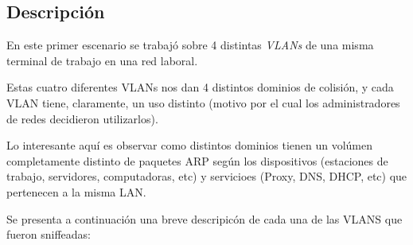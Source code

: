     \subsection{Descripci\'on}
    \par En este primer escenario se trabaj\'o sobre 4 distintas \textit{VLANs}
    de una misma terminal de trabajo en una red laboral.

    \par Estas cuatro diferentes VLANs nos dan 4 distintos dominios de colisi\'on,
    y cada VLAN tiene, claramente, un uso distinto (motivo por el cual los
    administradores de redes decidieron utilizarlos).

    \par Lo interesante aqu\'i es observar como distintos dominios tienen un
    vol\'umen completamente distinto de paquetes ARP seg\'un los dispositivos
    (estaciones de trabajo, servidores, computadoras, etc) y servicioes (Proxy,
    DNS, DHCP, etc) que pertenecen a la misma LAN.

    \par Se presenta a continuaci\'on una breve descripic\'on de cada una de las
    VLANS que fueron sniffeadas:

